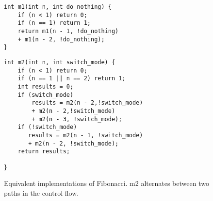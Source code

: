 \begin{figure}[h]
\begin{center}
\begin{minipage}{7 cm}
\begin{lstlisting}
int m1(int n, int do_nothing) {
    if (n < 1) return 0;
    if (n == 1) return 1;
    return m1(n - 1, !do_nothing) 
    + m1(n - 2, !do_nothing);
}
\end{lstlisting}
\end{minipage}
\begin{minipage}{7 cm}
\begin{lstlisting}
int m2(int n, int switch_mode) {
    if (n < 1) return 0;
    if (n == 1 || n == 2) return 1;
    int results = 0;
    if (switch_mode)
        results = m2(n - 2,!switch_mode) 
        + m2(n - 2,!switch_mode) 
        + m2(n - 3, !switch_mode);
    if (!switch_mode)
       results = m2(n - 1, !switch_mode) 
       + m2(n - 2, !switch_mode);
    return results;

}
\end{lstlisting}
\end{minipage}
\caption{Equivalent implementations of Fibonacci. m2 alternates between two paths in the control flow.}
\label{fig:f1f2switch}
\end{center}
\end{figure}

